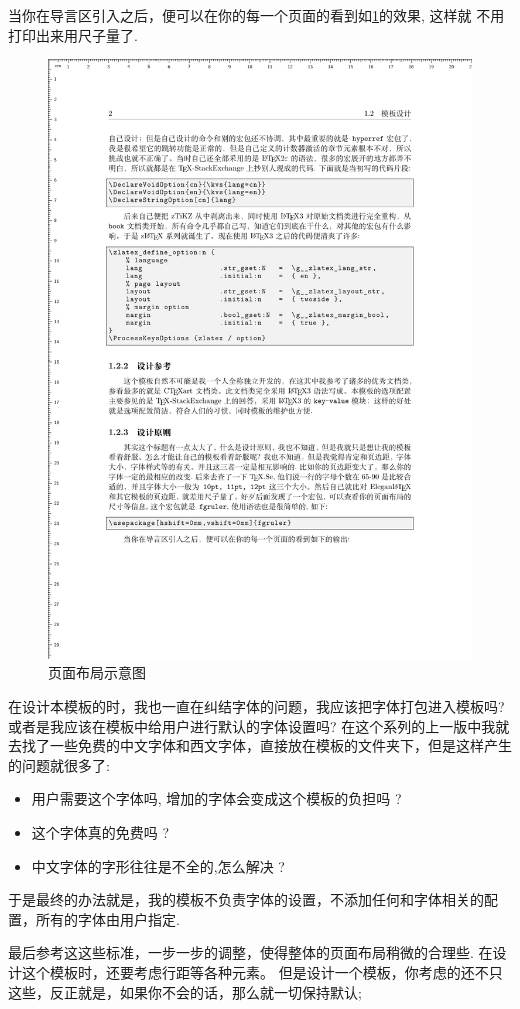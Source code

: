 \documentclass[
    lang=cn, 
    layout=oneside, 
    margin=false, 
    math-alias=true,
]{zlatex}
\begin{document}
当你在导言区引入之后，便可以在你的每一个页面的看到如\cref{fig:fgruler-example}的效果, 这样就 
不用打印出来用尺子量了.

\begin{figure}[!htb]
    \centering
    \includegraphics[width=.75\linewidth]{./pics/fgruler_example.pdf}
    \caption{页面布局示意图}
    \label{fig:fgruler-example}
\end{figure}

在设计本模板的时，我也一直在纠结字体的问题，我应该把字体打包进入模板吗? 或者是我应该在模板中给用户进行默认的字体设置吗?
在这个系列的上一版中我就去找了一些免费的中文字体和西文字体，直接放在模板的文件夹下，但是这样产生的问题就很多了:

\begin{itemize}
    \item 用户需要这个字体吗, 增加的字体会变成这个模板的负担吗 ?
    \item 这个字体真的免费吗 ?
    \item 中文字体的字形往往是不全的,怎么解决 ? 
\end{itemize}

于是最终的办法就是，我的模板不负责字体的设置，不添加任何和字体相关的配置，所有的字体由用户指定. 


最后参考这这些标准，一步一步的调整，使得整体的页面布局稍微的合理些. 在设计这个模板时，还要考虑行距等各种元素。
但是设计一个模板，你考虑的还不只这些，反正就是，如果你不会的话，那么就一切保持默认; 
\end{document}
